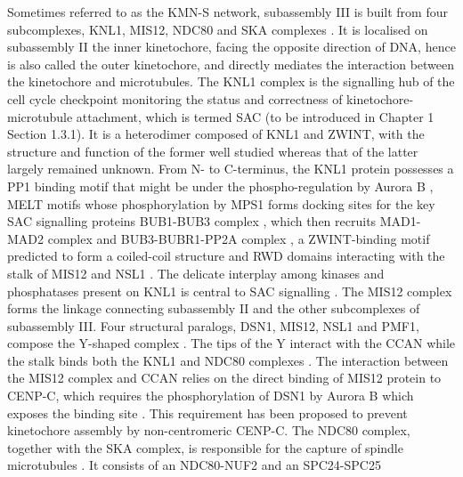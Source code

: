 Sometimes referred to as the KMN-S network, subassembly III is built from four subcomplexes, KNL1, MIS12, NDC80 and SKA complexes \citep{DeWulf2003HierarchicalSubcomplexes, Theis2009ComparativeDivision, Bharadwaj2004IdentificationComplex, McCleland2003TheActivity, Desai2003KNL-1Elegans, Obuse2004AZwint-1, Wigge2001TheSegregation, Westermann2003ArchitectureCore, Cheeseman2004ATension, Cheeseman2006TheKinetochore, Nekrasov2003InteractionsCerevisiae, Pinsky2003AnKinase, Kline2006, Welburn2009TheMotility, Gaitanos2009StableSka3/C13Orf3}. It is localised on subassembly II the inner kinetochore, facing the opposite direction of DNA, hence is also called the outer kinetochore, and directly mediates the interaction between the kinetochore and microtubules. The KNL1 complex is the signalling hub of the cell cycle checkpoint monitoring the status and correctness of kinetochore-microtubule attachment, which is termed SAC (to be introduced in Chapter 1 Section 1.3.1). It is a heterodimer composed of KNL1 and ZWINT, with the structure and function of the former well studied whereas that of the latter largely remained unknown. From N- to C-terminus, the KNL1 protein possesses a PP1 binding motif that might be under the phospho-regulation by Aurora B \citep{Liu2010RegulatedKinase, Rosenberg2011KNL1/Spc105Checkpoint, Roy2019}, MELT motifs whose phosphorylation by MPS1 forms docking sites for the key SAC signalling proteins BUB1-BUB3 complex \citep{Cheeseman2004ATension, Primorac2013Bub3Signaling, Shepperd2012, Yamagishi2012MPS1/Mph1Components, Vleugel2013ArrayedSegregation, London2012}, which then recruits MAD1-MAD2 complex and BUB3-BUBR1-PP2A complex \citep{Suijkerbuijk2012IntegrationAttachments, Kruse2013DirectProgression, Krenn2012StructuralInteraction}, a ZWINT-binding motif predicted to form a coiled-coil structure \citep{Petrovic2010TheAssembly} and RWD domains interacting with the stalk of MIS12 and NSL1 \citep{Petrovic2014ModularOrganization}. The delicate interplay among kinases and phosphatases present on KNL1 is central to SAC signalling \citep{Saurin2018KinaseKinetochore}. The MIS12 complex forms the linkage connecting subassembly II and the other subcomplexes of subassembly III. Four structural paralogs, DSN1, MIS12, NSL1 and PMF1, compose the Y-shaped complex \citep{Petrovic2010TheAssembly, Petrovic2016StructureKinetochores, Dimitrova2016StructureAssembly, Hornung2011MolecularComplex, Maskell2010MolecularComplex}. The tips of the Y interact with the CCAN \citep{Screpanti2011DirectKinetochore} while the stalk binds both the KNL1 and NDC80 complexes \citep{Petrovic2014ModularOrganization}. The interaction between the MIS12 complex and CCAN relies on the direct binding of MIS12 protein to CENP-C, which requires the phosphorylation of DSN1 by Aurora B which exposes the binding site \citep{Kim2015, Akiyoshi2013TheYeast, Bonner2019EnrichmentAssembly, Hara2018MultipleKinetochores, Rago2015DistinctCENP-T, Zhou2017PhosphorylationMitosis}. This requirement has been proposed to prevent kinetochore assembly by non-centromeric CENP-C. The NDC80 complex, together with the SKA complex, is responsible for the capture of spindle microtubules \citep{Cheeseman2006TheKinetochore, Wimbish2020Hec1/Ndc80Interface, DeLuca2006KinetochoreHec1}. It consists of an NDC80-NUF2 and an SPC24-SPC25 